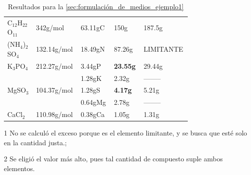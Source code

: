 \begin{table}[H]

\centering
\caption{Resultados para la \autoref{sec:formulación_de_medios_ejemplo1}}
\label{tab:resultados_formulación_de_medios_ejemplo1}

\begin{threeparttable}
{\small{}

\begin{tabular}{M{0.15\linewidth}M{0.15\linewidth}M{0.15\linewidth}M{0.15\linewidth}M{0.15\linewidth}}\hline

     &  &  &  &  \\ \hline
    
    C$_{12}$H$_{22}$O$_{11}$ &    342g/mol & 63.11gC  &            150g           &   187.5g  \\
    (NH$_{4}$)$_{2}$SO$_{4}$ & 132.14g/mol & 18.49gN  &           87.26g          & LIMITANTE \\
    K$_{3}$PO$_{4}$          & 212.27g/mol &  3.44gP  &  \textbf{23.55g} &  29.44g   \\
                             &             &  1.28gK  &            2.32g          &  -------- \\
    MgSO$_{3}$               & 104.37g/mol &  1.28gS  &   \textbf{4.17g} &   5.21g   \\
                             &             &  0.64gMg &            2.78g          &  -------- \\
    CaCl$_{2}$               & 110.98g/mol &  0.38gCa &            1.05g          &   1.31g   \\
    
    \hline
\end{tabular}}

\begin{tablenotes}\tiny %
    \item[1] No se calculó el exceso porque es el elemento limitante, y se busca que esté solo en la cantidad justa.; 
    \item[2] Se eligió el valor más alto, pues tal cantidad de compuesto suple ambos elementos.
\end{tablenotes}

\end{threeparttable}
\end{table}
